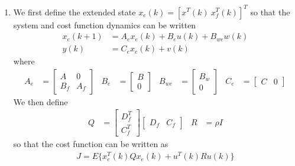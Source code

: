 \begin{enumerate}
    \item
    We first define the extended state $x_e(k) = [x^T(k) \ x_f^T(k)]^T$ so that the system and cost function dynamics can be written
    \begin{align}
        x_e(k+1) & = A_e x_e(k) + B_e u(k) + B_{we} w(k)
            \label{eq:m2p3_syse1} \\
        y(k) & = C_e x_e(k) + v(k)
            \label{eq:m2p3_syse2}
    \end{align}
    where
    \begin{align*}
        A_e & = \begin{bmatrix}
                A & 0 \\
                B_f & A_f
            \end{bmatrix}
            & B_e & = \begin{bmatrix}
                B \\
                0
            \end{bmatrix}
            & B_{we} & = \begin{bmatrix}
                B_w \\
                0
            \end{bmatrix}
            & C_e & = \begin{bmatrix}
                C & 0
            \end{bmatrix}
    \end{align*}
    We then define
    \begin{align*}
        Q & = \begin{bmatrix}
                D_f^T \\
                C_f^T
            \end{bmatrix} \begin{bmatrix}
                D_f & C_f
            \end{bmatrix} 
            & R & = \rho I
    \end{align*}
    so that the cost function can be written as
    \begin{align}
        J = E \{ x_e^T(k) Qx_e(k) + u^T(k) Ru(k) \}
            \label{eq:m2p3_coste}
    \end{align}
    

\end{enumerate}
